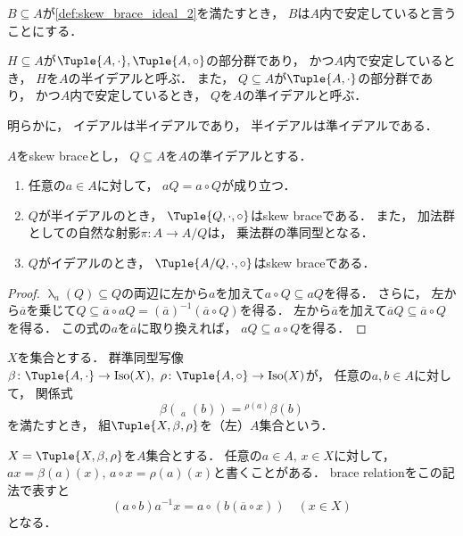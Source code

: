 \documentclass{jlreq}
\newcommand{\Conj}[1]{{}^{#1}\!}
\DeclareMathOperator{\LambdaMap}{\lambda}
\DeclareMathOperator{\LambdaMapOp}{\lambda^{\mathrm{op}}}
\DeclareMathOperator{\Iso}{Iso}
\begin{document}
	$B \subseteq A$が\cref{def:skew_brace_ideal_2}を満たすとき，
	$B$は$A$内で安定していると言うことにする．
	
	\begin{definition}
		$H \subseteq A$が$\Tuple{A, \cdot}, \Tuple{A, \circ}$の部分群であり，
		かつ$A$内で安定しているとき，
		$H$を$A$の半イデアルと呼ぶ．
		また，
		$Q \subseteq A$が$\Tuple{A, \cdot}$の部分群であり，
		かつ$A$内で安定しているとき，
		$Q$を$A$の準イデアルと呼ぶ．
	\end{definition}
	
	明らかに，
	イデアルは半イデアルであり，
	半イデアルは準イデアルである．
	
	\begin{proposition}
		$A$をskew braceとし，
		$Q \subseteq A$を$A$の準イデアルとする．
		\begin{enumerate}
			\item 任意の$a \in A$に対して，
			$a Q = a \circ Q$が成り立つ．
			\item $Q$が半イデアルのとき，
			$\Tuple{Q, \cdot, \circ}$はskew braceである．
			また，
			加法群としての自然な射影$\pi \colon A \to A/Q$は，
			乗法群の準同型となる．
			\item $Q$がイデアルのとき，
			$\Tuple{A/Q, \cdot, \circ}$はskew braceである．
		\end{enumerate}
	\end{proposition}
	
	\begin{proof}
		$\LambdaMap_a(Q) \subseteq Q$の両辺に左から$a$を加えて$a \circ Q \subseteq aQ$を得る．
		さらに，
		左から$\overline{a}$を乗じて$Q \subseteq \overline{a} \circ aQ = (\overline{a})^{-1}(\overline{a} \circ Q)$を得る．
		左から$\overline{a}$を加えて$\overline{a}Q \subseteq \overline{a} \circ Q$を得る．
		この式の$a$を$\overline{a}$に取り換えれば，
		$aQ \subseteq a \circ Q$を得る．
	\end{proof}
	
	\begin{definition}
		$X$を集合とする．
		群準同型写像$\beta \colon \Tuple{A, \cdot} \to \Iso(X),\ \rho \colon \Tuple{A, \circ} \to \Iso(X)$が，
		任意の$a, b \in A$に対して，
		関係式
		\begin{equation}\label{eq:brace_act_rel}
			\beta(\LambdaMapOp_a(b)) = \Conj{\rho(a)}\beta(b)
		\end{equation}
		を満たすとき，
		組$\Tuple{X, \beta, \rho}$を（左）$A$集合という．
	\end{definition}
	
	$X = \Tuple{X, \beta, \rho}$を$A$集合とする．
	任意の$a \in A,\, x \in X$に対して，
	$a x = \beta(a)(x),\, a \circ x = \rho(a)(x)$と書くことがある．
	brace relationをこの記法で表すと
	\begin{equation}
		(a \circ b) a^{-1} x = a \circ (b (\overline{a} \circ x)) \quad (x \in X)
	\end{equation}
	となる．
	
\end{document}
